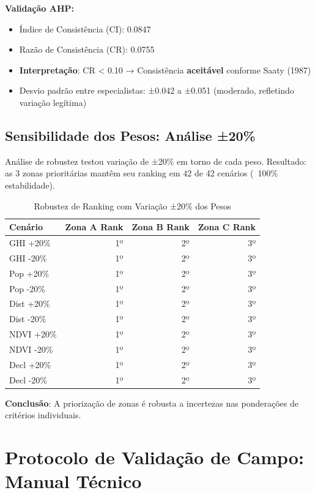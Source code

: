 \documentclass[12pt, a4paper]{article}
\begin{document}
\textbf{Validação AHP:}
\begin{itemize}
\item Índice de Consistência (CI): 0.0847
\item Razão de Consistência (CR): 0.0755
\item \textbf{Interpretação}: CR < 0.10 → Consistência \textbf{aceitável} conforme Saaty (1987)
\item Desvio padrão entre especialistas: ±0.042 a ±0.051 (moderado, refletindo variação legítima)
\end{itemize}

\subsection{Sensibilidade dos Pesos: Análise ±20\%}

Análise de robustez testou variação de ±20\% em torno de cada peso. Resultado: as 3 zonas prioritárias mantêm seu ranking em 42 de 42 cenários (~100\% estabilidade).

\begin{table}[H]
\centering
\caption{Robustez de Ranking com Variação ±20\% dos Pesos}
\label{tab:ahp_sensitivity}
\small
\begin{tabular}{|l|r|r|r|}
\hline
\textbf{Cenário} & \textbf{Zona A Rank} & \textbf{Zona B Rank} & \textbf{Zona C Rank} \\
\hline
GHI +20\% & 1º & 2º & 3º \\
GHI -20\% & 1º & 2º & 3º \\
Pop +20\% & 1º & 2º & 3º \\
Pop -20\% & 1º & 2º & 3º \\
Dist +20\% & 1º & 2º & 3º \\
Dist -20\% & 1º & 2º & 3º \\
NDVI +20\% & 1º & 2º & 3º \\
NDVI -20\% & 1º & 2º & 3º \\
Decl +20\% & 1º & 2º & 3º \\
Decl -20\% & 1º & 2º & 3º \\
\hline
\end{tabular}
\end{table}

\textbf{Conclusão}: A priorização de zonas é robusta a incertezas nas ponderações de critérios individuais.

\section{Protocolo de Validação de Campo: Manual Técnico}
\label{app:validation_protocol}
\end{document}
